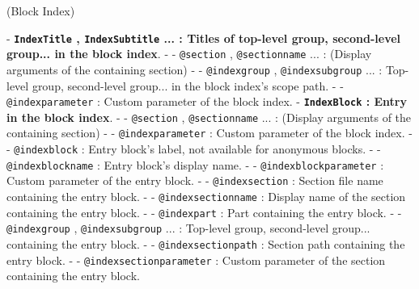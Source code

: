 (\large Block Index){
    \par\medskip{}
    - \textbf{\texttt{IndexTitle} , \texttt{IndexSubtitle} ... : Titles of top-level group, second-level group... in the block index}.
        - - \texttt{@section} , \texttt{@sectionname} ... : (Display arguments of the containing section)
        - - \texttt{@indexgroup} , \texttt{@indexsubgroup} ... : Top-level group, second-level group... in the block index's scope path.
        - - \texttt{@indexparameter} : Custom parameter of the block index.
    - \textbf{\texttt{IndexBlock} : Entry in the block index}.
        - - \texttt{@section} , \texttt{@sectionname} ... : (Display arguments of the containing section)
        - - \texttt{@indexparameter} : Custom parameter of the block index.
        - - \texttt{@indexblock} : Entry block's label, not available for anonymous blocks.
        - - \texttt{@indexblockname} : Entry block's display name.
        - - \texttt{@indexblockparameter} : Custom parameter of the entry block.
        - - \texttt{@indexsection} : Section file name containing the entry block.
        - - \texttt{@indexsectionname} : Display name of the section containing the entry block.
        - - \texttt{@indexpart} : Part containing the entry block.
        - - \texttt{@indexgroup} , \texttt{@indexsubgroup} ... : Top-level group, second-level group... containing the entry block.
        - - \texttt{@indexsectionpath} : Section path containing the entry block.
        - - \texttt{@indexsectionparameter} : Custom parameter of the section containing the entry block.
}

